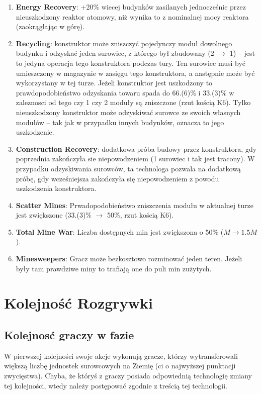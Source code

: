\documentclass[11pt,a4paper]{article}
\begin{document}
\begin{enumerate}
\item \textbf{Energy Recovery}: +20\% wiecej budynków zasilanych jednocześnie przez nieuszkodzony reaktor atomowy, niż wynika to z nominalnej mocy reaktora (zaokrąglając w górę).
\item \textbf{Recycling}: konstruktor może zniszczyć pojedynczy moduł dowolnego budynku i odzyskać jeden surowiec, z którego był zbudowany (2 $\to$ 1) -- jest to jedyna operacja tego konstruktora podczas tury. Ten surowiec musi być umieszczony w magazynie w zasięgu tego konstruktora, a następnie może być wykorzystany w tej turze. Jeżeli konstruktor jest uszkodzony to prawdopodobieństwo odzyskania towaru spada do 66.(6)\% i 33.(3)\% w zaleznosci od tego czy 1 czy 2 moduły są zniszczone (rzut kością K6). Tylko nieuszkodzony konstruktor może odzyskiwać surowce ze swoich własnych modułów -- tak jak w przypadku innych budynków, oznacza to jego uszkodzenie.
\item \textbf{Construction Recovery}: dodatkowa próba budowy przez konstruktora, gdy poprzednia zakończyła sie niepowodzeniem (1 surowiec i tak jest tracony). W przypadku odzyskiwania surowców, ta technologa pozwala na dodatkową próbę, gdy wcześniejsza zakończyła się niepowodzeniem z powodu uszkodzenia konstruktora.
\item \textbf{Scatter Mines}: Prwadopodobieństwo zniszczenia modułu w aktualnej turze jest zwiększone (33.(3)\% $\to$ 50\%, rzut kością K6).  
\item \textbf{Total Mine War}: Liczba dostępnych min jest zwiększona o 50\% ($M \to 1.5 M$).
\item \textbf{Minesweepers}: Gracz może bezkosztowo rozminować jeden teren. Jeżeli były tam prawdziwe miny to trafiają one do puli min zużytych.
  
\end{enumerate}

\newpage
\section{Kolejność Rozgrywki}

\subsection{Kolejnosć graczy w fazie}

W pierwszej kolejności swoje akcje wykonują gracze, którzy wytransferowali większą liczbę jednostek surowcowych na Ziemię (ci o najwyższej punktacji zwycięstwa). Chyba, że któryś z graczy posiada odpowiednią technologię zmiany tej kolejności, wtedy należy postępować zgodnie z treścią tej technologii.
\end{document}
